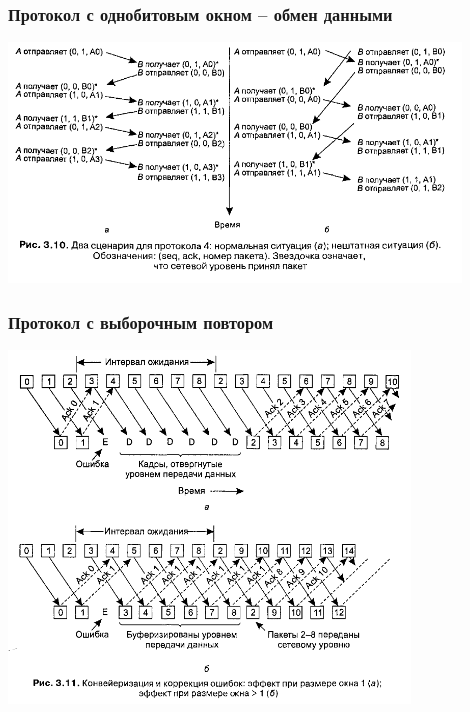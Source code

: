 \documentclass[utf8]{beamer}
\begin{document}
\begin{frame}
\frametitle{Протокол с однобитовым окном -- обмен данными}
\begin{center}
\includegraphics[width=0.9\textwidth]{pic/sliding-window-execution.png}
\end{center}
\end{frame}
\begin{frame}
\frametitle{Протокол с выборочным повтором}
\begin{center}
\includegraphics[width=0.8\textwidth]{pic/sliding-window-revert.png}
\end{center}
\end{frame}
\end{document}
